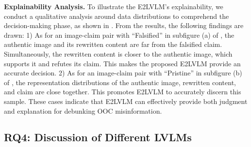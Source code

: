 \noindent \textbf{Explainability Analysis.} To illustrate the E2LVLM's explainability, we conduct a qualitative analysis around data distributions to comprehend the decision-making phase, as shown in . From the results, the following findings are drawn: 1) As for an image-claim pair with ``Falsified'' in subfigure (a) of , the authentic image and its rewritten content are far from the falsified claim. Simultaneously, the rewritten content is closer to the authentic image, which supports it and refutes its claim. This makes the proposed E2LVLM provide an accurate decision. 2) As for an image-claim pair with ``Pristine'' in subfigure (b) of , the representation distributions of the authentic image, rewritten content, and claim are close together. This promotes E2LVLM to accurately discern this sample. These cases indicate that E2LVLM can effectively provide both judgment and explanation for debunking OOC misinformation.

\subsection{RQ4: Discussion of Different LVLMs}






